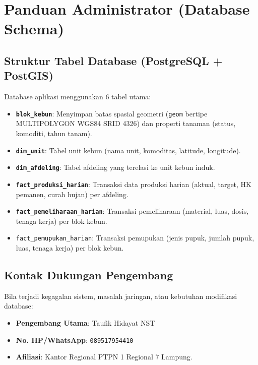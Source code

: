 \documentclass[12pt, a4paper]{article}
\begin{document}
\newpage

\section{Panduan Administrator (Database Schema)}

\subsection{Struktur Tabel Database (PostgreSQL + PostGIS)}
Database aplikasi menggunakan 6 tabel utama:
\begin{itemize}
    \item \textbf{\texttt{blok\_kebun}}: Menyimpan batas spasial geometri (\texttt{geom} bertipe MULTIPOLYGON WGS84 SRID 4326) dan properti tanaman (status, komoditi, tahun tanam).
    \item \textbf{\texttt{dim\_unit}}: Tabel unit kebun (nama unit, komoditas, latitude, longitude).
    \item \textbf{\texttt{dim\_afdeling}}: Tabel afdeling yang terelasi ke unit kebun induk.
    \item \textbf{\texttt{fact\_produksi\_harian}}: Transaksi data produksi harian (aktual, target, HK pemanen, curah hujan) per afdeling.
    \item \textbf{\texttt{fact\_pemeliharaan\_harian}}: Transaksi pemeliharaan (material, luas, dosis, tenaga kerja) per blok kebun.
    \item \texttt{fact\_pemupukan\_harian}: Transaksi pemupukan (jenis pupuk, jumlah pupuk, luas, tenaga kerja) per blok kebun.
\end{itemize}

\subsection{Kontak Dukungan Pengembang}
Bila terjadi kegagalan sistem, masalah jaringan, atau kebutuhan modifikasi database:
\begin{itemize}
    \item \textbf{Pengembang Utama}: Taufik Hidayat NST
    \item \textbf{No. HP/WhatsApp}: \texttt{089517954410}
    \item \textbf{Afiliasi}: Kantor Regional PTPN 1 Regional 7 Lampung.
\end{itemize}
\end{document}
